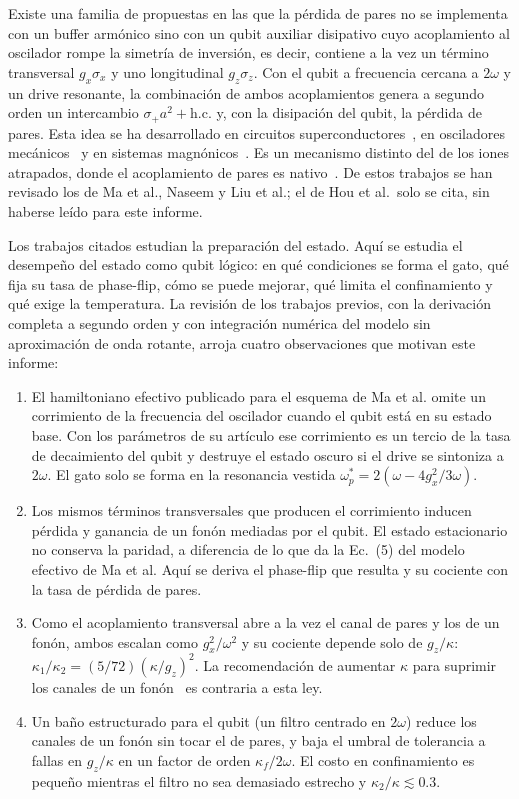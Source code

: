 \documentclass[11pt,a4paper]{article}
\theoremstyle{definition}
\begin{document}
Existe una familia de propuestas en las que la pérdida de pares no se implementa con un buffer armónico sino con un qubit auxiliar disipativo cuyo acoplamiento al oscilador rompe la simetría de inversión, es decir, contiene a la vez un término transversal $g_x\sigma_x$ y uno longitudinal $g_z\sigma_z$. Con el qubit a frecuencia cercana a $2\omega$ y un drive resonante, la combinación de ambos acoplamientos genera a segundo orden un intercambio $\sigma_+a^2+\mathrm{h.c.}$ y, con la disipación del qubit, la pérdida de pares. Esta idea se ha desarrollado en circuitos superconductores~\cite{Ma2019}, en osciladores mecánicos~\cite{Naseem2026} y en sistemas magnónicos~\cite{Hou2024,Liu2025}. Es un mecanismo distinto del de los iones atrapados, donde el acoplamiento de pares es nativo~\cite{deMatos1996}. De estos trabajos se han revisado los de Ma et al., Naseem y Liu et al.; el de Hou et al.\ solo se cita, sin haberse leído para este informe.

Los trabajos citados estudian la preparación del estado. Aquí se estudia el desempeño del estado como qubit lógico: en qué condiciones se forma el gato, qué fija su tasa de phase-flip, cómo se puede mejorar, qué limita el confinamiento y qué exige la temperatura. La revisión de los trabajos previos, con la derivación completa a segundo orden y con integración numérica del modelo sin aproximación de onda rotante, arroja cuatro observaciones que motivan este informe:

\begin{enumerate}
\item El hamiltoniano efectivo publicado para el esquema de Ma et al. omite un corrimiento de la frecuencia del oscilador cuando el qubit está en su estado base. Con los parámetros de su artículo ese corrimiento es un tercio de la tasa de decaimiento del qubit y destruye el estado oscuro si el drive se sintoniza a $2\omega$. El gato solo se forma en la resonancia vestida $\omega_p^{*}=2(\omega-4g_x^2/3\omega)$.
\item Los mismos términos transversales que producen el corrimiento inducen pérdida y ganancia de un fonón mediadas por el qubit. El estado estacionario no conserva la paridad, a diferencia de lo que da la Ec.~(5) del modelo efectivo de Ma et al. Aquí se deriva el phase-flip que resulta y su cociente con la tasa de pérdida de pares.
\item Como el acoplamiento transversal abre a la vez el canal de pares y los de un fonón, ambos escalan como $g_x^2/\omega^2$ y su cociente depende solo de $g_z/\kappa$: $\kappa_1/\kappa_2=(5/72)(\kappa/g_z)^2$. La recomendación de aumentar $\kappa$ para suprimir los canales de un fonón~\cite{Naseem2026} es contraria a esta ley.
\item Un baño estructurado para el qubit (un filtro centrado en $2\omega$) reduce los canales de un fonón sin tocar el de pares, y baja el umbral de tolerancia a fallas en $g_z/\kappa$ en un factor de orden $\kappa_f/2\omega$. El costo en confinamiento es pequeño mientras el filtro no sea demasiado estrecho y $\kappa_2/\kappa\lesssim0.3$.
\end{enumerate}
\end{document}
